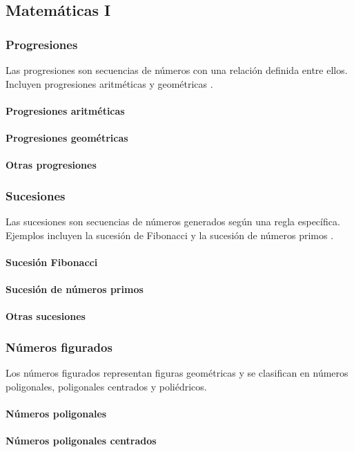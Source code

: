 \subsection{Matemáticas I}
\subsubsection{Progresiones}
Las progresiones son secuencias de números con una relación definida entre ellos. Incluyen progresiones aritméticas y geométricas \cite{skiena2008algorithm}.
\paragraph{Progresiones aritméticas}
\paragraph{Progresiones geométricas}
\paragraph{Otras progresiones}
\subsubsection{Sucesiones}
Las sucesiones son secuencias de números generados según una regla específica. Ejemplos incluyen la sucesión de Fibonacci y la sucesión de números primos \cite{ahmed2020competitive}.
\paragraph{Sucesión Fibonacci}
\paragraph{Sucesión de números primos}
\paragraph{Otras sucesiones}
\subsubsection{Números figurados}
Los números figurados representan figuras geométricas y se clasifican en números poligonales, poligonales centrados y poliédricos.
\paragraph{Números poligonales}
\paragraph{Números poligonales centrados}
